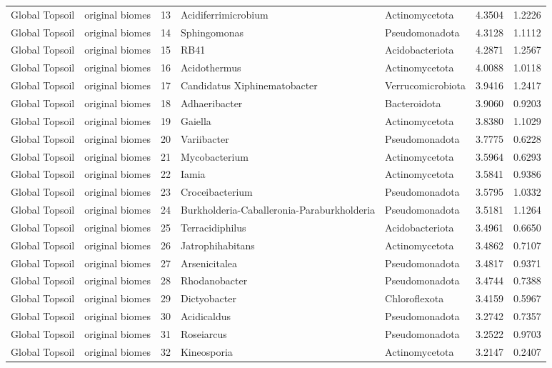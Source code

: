 \documentclass[12pt, oneside]{report}
\begin{document}
\begin{center}
\begin{longtable}{llrp{2.7cm}p{2.2cm}rr}
Global Topsoil & original biomes & 13 & Acidiferrimicrobium & Actinomycetota & 4.3504 & 1.2226 \\
Global Topsoil & original biomes & 14 & Sphingomonas & Pseudomonadota & 4.3128 & 1.1112 \\
Global Topsoil & original biomes & 15 & RB41 & Acidobacteriota & 4.2871 & 1.2567 \\
Global Topsoil & original biomes & 16 & Acidothermus & Actinomycetota & 4.0088 & 1.0118 \\
Global Topsoil & original biomes & 17 & Candidatus Xiphinematobacter & Verrucomicrobiota & 3.9416 & 1.2417 \\
Global Topsoil & original biomes & 18 & Adhaeribacter & Bacteroidota & 3.9060 & 0.9203 \\
Global Topsoil & original biomes & 19 & Gaiella & Actinomycetota & 3.8380 & 1.1029 \\
Global Topsoil & original biomes & 20 & Variibacter & Pseudomonadota & 3.7775 & 0.6228 \\
Global Topsoil & original biomes & 21 & Mycobacterium & Actinomycetota & 3.5964 & 0.6293 \\
Global Topsoil & original biomes & 22 & Iamia & Actinomycetota & 3.5841 & 0.9386 \\
Global Topsoil & original biomes & 23 & Croceibacterium & Pseudomonadota & 3.5795 & 1.0332 \\
Global Topsoil & original biomes & 24 & Burkholderia-Caballeronia-Paraburkholderia & Pseudomonadota & 3.5181 & 1.1264 \\
Global Topsoil & original biomes & 25 & Terracidiphilus & Acidobacteriota & 3.4961 & 0.6650 \\
Global Topsoil & original biomes & 26 & Jatrophihabitans & Actinomycetota & 3.4862 & 0.7107 \\
Global Topsoil & original biomes & 27 & Arsenicitalea & Pseudomonadota & 3.4817 & 0.9371 \\
Global Topsoil & original biomes & 28 & Rhodanobacter & Pseudomonadota & 3.4744 & 0.7388 \\
Global Topsoil & original biomes & 29 & Dictyobacter & Chloroflexota & 3.4159 & 0.5967 \\
Global Topsoil & original biomes & 30 & Acidicaldus & Pseudomonadota & 3.2742 & 0.7357 \\
Global Topsoil & original biomes & 31 & Roseiarcus & Pseudomonadota & 3.2522 & 0.9703 \\
Global Topsoil & original biomes & 32 & Kineosporia & Actinomycetota & 3.2147 & 0.2407 \\

\end{longtable}
\end{center}
\end{document}
